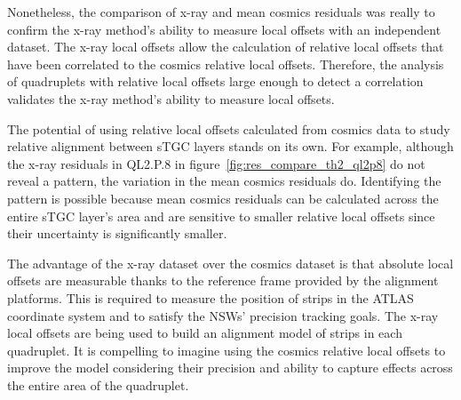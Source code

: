 Nonetheless, the comparison of x-ray and mean cosmics residuals was really to confirm the x-ray method's ability to measure local offsets with an independent dataset. The x-ray local offsets allow the calculation of relative local offsets that have been correlated to the cosmics relative local offsets. Therefore, the analysis of quadruplets with relative local offsets large enough to detect a correlation validates the x-ray method's ability to measure local offsets. 

The potential of using relative local offsets calculated from cosmics data to study relative alignment between sTGC layers stands on its own. For example, although the x-ray residuals in QL2.P.8 in figure~\ref{fig:res_compare_th2_ql2p8} do not reveal a pattern, the variation in the mean cosmics residuals do. Identifying the pattern is possible because mean cosmics residuals can be calculated across the entire sTGC layer's area and are sensitive to smaller relative local offsets since their uncertainty is significantly smaller. 

The advantage of the x-ray dataset over the cosmics dataset is that absolute local offsets are measurable thanks to the reference frame provided by the alignment platforms. This is required to measure the position of strips in the ATLAS coordinate system and to satisfy the NSWs' precision tracking goals. The x-ray local offsets are being used to build an alignment model of strips in each quadruplet. It is compelling to imagine using the cosmics relative local offsets to improve the model considering their precision and ability to capture effects across the entire area of the quadruplet.